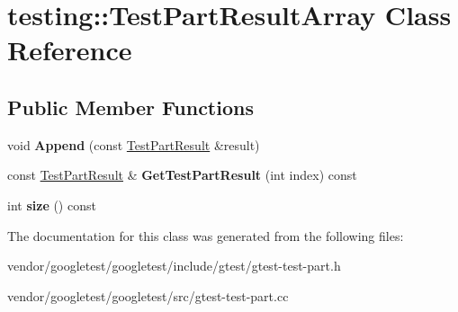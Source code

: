 \hypertarget{classtesting_1_1_test_part_result_array}{}\section{testing\+:\+:Test\+Part\+Result\+Array Class Reference}
\label{classtesting_1_1_test_part_result_array}
\subsection*{Public Member Functions}
\begin{DoxyCompactItemize}
\item 
\mbox{\label{classtesting_1_1_test_part_result_array_a01844bd505b18a666324617a1b459558}} 
void {\bfseries Append} (const \mbox{\hyperlink{classtesting_1_1_test_part_result}{Test\+Part\+Result}} \&result)
\item 
\mbox{\label{classtesting_1_1_test_part_result_array_aa44d02a01c87f47393b07951bab6e025}} 
const \mbox{\hyperlink{classtesting_1_1_test_part_result}{Test\+Part\+Result}} \& {\bfseries Get\+Test\+Part\+Result} (int index) const
\item 
\mbox{\label{classtesting_1_1_test_part_result_array_a31555f11ba42b81ddad0a26a87710d0a}} 
int {\bfseries size} () const
\end{DoxyCompactItemize}


The documentation for this class was generated from the following files\+:\begin{DoxyCompactItemize}
\item 
vendor/googletest/googletest/include/gtest/gtest-\/test-\/part.\+h\item 
vendor/googletest/googletest/src/gtest-\/test-\/part.\+cc\end{DoxyCompactItemize}
